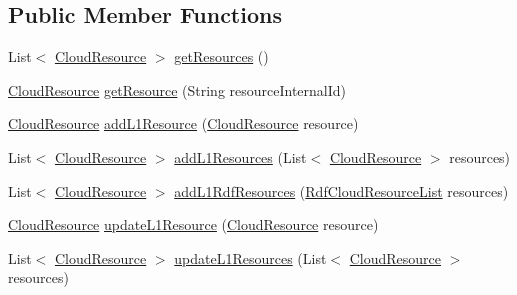 \subsection*{Public Member Functions}
\begin{DoxyCompactItemize}
\item 
List$<$ \hyperlink{classeu_1_1h2020_1_1symbiote_1_1cloud_1_1model_1_1internal_1_1CloudResource}{Cloud\+Resource} $>$ \hyperlink{interfaceeu_1_1h2020_1_1symbiote_1_1client_1_1interfaces_1_1RHClient_a116bb408726cd3d423236c56bdd18af3}{get\+Resources} ()
\item 
\hyperlink{classeu_1_1h2020_1_1symbiote_1_1cloud_1_1model_1_1internal_1_1CloudResource}{Cloud\+Resource} \hyperlink{interfaceeu_1_1h2020_1_1symbiote_1_1client_1_1interfaces_1_1RHClient_a13899a508ce181ceafd5e04fe5147a4a}{get\+Resource} (String resource\+Internal\+Id)
\item 
\hyperlink{classeu_1_1h2020_1_1symbiote_1_1cloud_1_1model_1_1internal_1_1CloudResource}{Cloud\+Resource} \hyperlink{interfaceeu_1_1h2020_1_1symbiote_1_1client_1_1interfaces_1_1RHClient_a7144c5a23f5e77e2fd10c2b79fcacf50}{add\+L1\+Resource} (\hyperlink{classeu_1_1h2020_1_1symbiote_1_1cloud_1_1model_1_1internal_1_1CloudResource}{Cloud\+Resource} resource)
\item 
List$<$ \hyperlink{classeu_1_1h2020_1_1symbiote_1_1cloud_1_1model_1_1internal_1_1CloudResource}{Cloud\+Resource} $>$ \hyperlink{interfaceeu_1_1h2020_1_1symbiote_1_1client_1_1interfaces_1_1RHClient_a80cce815fd699a09524ed5aa40b9af0e}{add\+L1\+Resources} (List$<$ \hyperlink{classeu_1_1h2020_1_1symbiote_1_1cloud_1_1model_1_1internal_1_1CloudResource}{Cloud\+Resource} $>$ resources)
\item 
List$<$ \hyperlink{classeu_1_1h2020_1_1symbiote_1_1cloud_1_1model_1_1internal_1_1CloudResource}{Cloud\+Resource} $>$ \hyperlink{interfaceeu_1_1h2020_1_1symbiote_1_1client_1_1interfaces_1_1RHClient_a63d6d5525a8d7cc6b046dbd6229fddb4}{add\+L1\+Rdf\+Resources} (\hyperlink{classeu_1_1h2020_1_1symbiote_1_1cloud_1_1model_1_1internal_1_1RdfCloudResourceList}{Rdf\+Cloud\+Resource\+List} resources)
\item 
\hyperlink{classeu_1_1h2020_1_1symbiote_1_1cloud_1_1model_1_1internal_1_1CloudResource}{Cloud\+Resource} \hyperlink{interfaceeu_1_1h2020_1_1symbiote_1_1client_1_1interfaces_1_1RHClient_a4428c0bb91f9433dae6a0ef98a696d11}{update\+L1\+Resource} (\hyperlink{classeu_1_1h2020_1_1symbiote_1_1cloud_1_1model_1_1internal_1_1CloudResource}{Cloud\+Resource} resource)
\item 
List$<$ \hyperlink{classeu_1_1h2020_1_1symbiote_1_1cloud_1_1model_1_1internal_1_1CloudResource}{Cloud\+Resource} $>$ \hyperlink{interfaceeu_1_1h2020_1_1symbiote_1_1client_1_1interfaces_1_1RHClient_a91c3ca12af4ec03fb196736953b690db}{update\+L1\+Resources} (List$<$ \hyperlink{classeu_1_1h2020_1_1symbiote_1_1cloud_1_1model_1_1internal_1_1CloudResource}{Cloud\+Resource} $>$ resources)

\end{DoxyCompactItemize}
